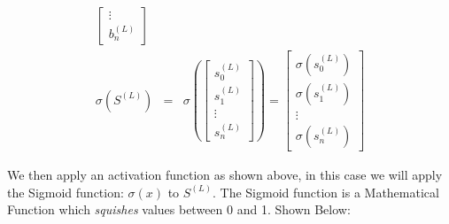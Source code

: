 \begin{flushleft}
\begin{eqnarray*}
\begin{bmatrix}
                        \vdots      \\
                        b^{(L)}_{n} 
                        \end{bmatrix} \\
                        \sigma(S^{(L)}) &=& \sigma\left(
                        \begin{bmatrix}
                        s^{(L)}_{0} \\
                        s^{(L)}_{1} \\
                        \vdots      \\
                        s^{(L)}_{n} 
                        \end{bmatrix}
                        \right)
                        =
                        \begin{bmatrix}
                        \sigma(s^{(L)}_{0}) \\
                        \sigma(s^{(L)}_{1}) \\
                        \vdots              \\
                        \sigma(s^{(L)}_{n}) 
                        \end{bmatrix}
                    \end{eqnarray*}
                
                    \vspace{0.2cm}
                    We then apply an activation function as shown above, in this case we will apply the Sigmoid function: $\sigma(x)$ to $S^{(L)}$. 
                    The Sigmoid function is a Mathematical Function which \textit{squishes} values between 0 and 1. Shown Below:
                    
                    \begin{center}
                    \end{center}


\end{flushleft}
